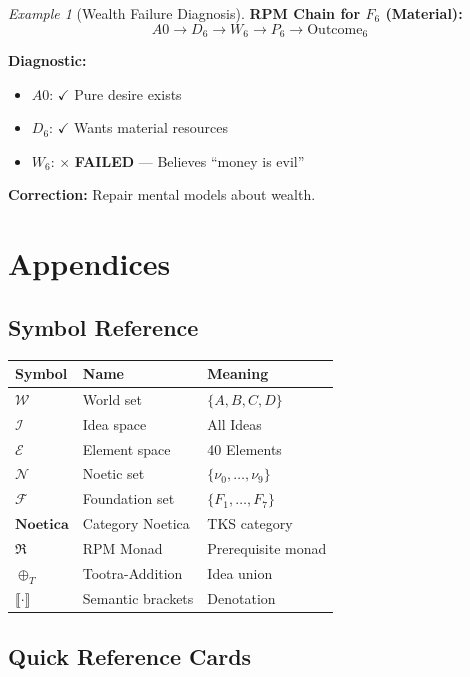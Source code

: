 \documentclass[11pt,twoside,openright]{book}
\theoremstyle{definition}
\theoremstyle{plain}
\theoremstyle{remark}
\newtheorem{example}[definition]{Example}
\newcommand{\sem}[1]{\llbracket #1 \rrbracket}
\newcommand{\Worlds}{\mathcal{W}}
\newcommand{\Ideas}{\mathcal{I}}
\newcommand{\Elements}{\mathcal{E}}
\newcommand{\Noetics}{\mathcal{N}}
\newcommand{\Foundations}{\mathcal{F}}
\newcommand{\Noetica}{\mathbf{Noetica}}
\newcommand{\noe}[1]{\nu_{#1}}
\newcommand{\Tadd}{\oplus_T}
\newcommand{\RPM}{\mathfrak{R}}
\begin{document}
\begin{example}[Wealth Failure Diagnosis]
\label{ex:wealth-failure}
\textbf{RPM Chain for $F_6$ (Material):}
\[
A0 \to D_6 \to W_6 \to P_6 \to \mathrm{Outcome}_6
\]

\textbf{Diagnostic:}
\begin{itemize}
  \item $A0$: $\checkmark$ Pure desire exists
  \item $D_6$: $\checkmark$ Wants material resources
  \item $W_6$: $\times$ \textbf{FAILED} --- Believes ``money is evil''
\end{itemize}

\textbf{Correction:} Repair mental models about wealth.
\end{example}

\appendix
\part{Appendices}

\chapter{Symbol Reference}
\label{app:symbols}

\begin{longtable}{lll}
\toprule
\textbf{Symbol} & \textbf{Name} & \textbf{Meaning} \\
\midrule
$\Worlds$ & World set & $\{A, B, C, D\}$ \\
$\Ideas$ & Idea space & All Ideas \\
$\Elements$ & Element space & 40 Elements \\
$\Noetics$ & Noetic set & $\{\noe{0}, \ldots, \noe{9}\}$ \\
$\Foundations$ & Foundation set & $\{F_1, \ldots, F_7\}$ \\
$\Noetica$ & Category Noetica & TKS category \\
$\RPM$ & RPM Monad & Prerequisite monad \\
$\Tadd$ & Tootra-Addition & Idea union \\
$\sem{\cdot}$ & Semantic brackets & Denotation \\
\bottomrule
\end{longtable}

\chapter{Quick Reference Cards}
\label{app:quickref}
\end{document}
